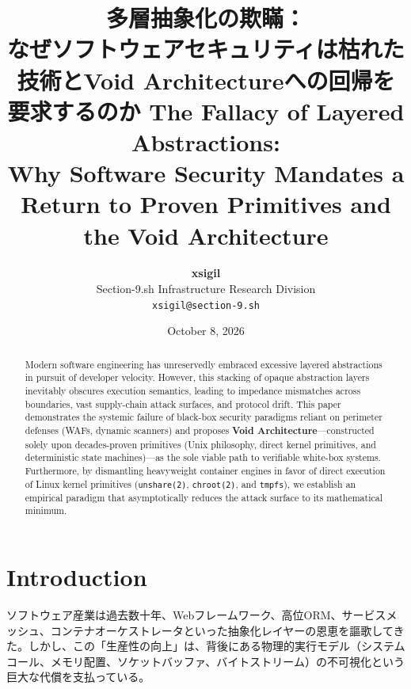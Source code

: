 \documentclass[10pt,a4paper,twocolumn]{article}
\title{\textbf{\Large 
\ifja
多層抽象化の欺瞞：\\なぜソフトウェアセキュリティは枯れた技術とVoid Architecture\texttrademark への回帰を要求するのか
\else
The Fallacy of Layered Abstractions:\\Why Software Security Mandates a Return to Proven Primitives and the Void Architecture\texttrademark
\fi
}}
\author{
    \textbf{xsigil} \\
    Section-9.sh Infrastructure Research Division \\
    \texttt{xsigil@section-9.sh}
}
\date{October 8, 2026}
\newif\ifja
\begin{document}
\maketitle

\begin{abstract}
\ifja
現代のソフトウェア工学は、開発スループットの向上と引き換えに、過度な多層抽象化（Layered Abstraction）を無批判に受け入れてきた。しかし、抽象化レイヤーの積層はシステム内部の実行セマンティクスを不可視化し、境界間のインピーダンスミスマッチ、巨大なサプライチェーン攻撃面、プロトコル解釈の乖離を構造的にもたらす。本稿では、境界防御（WAF、動的解析スキャナ）に依存するブラックボックスセキュリティの破綻を数学的に証明し、システムを検証可能な「ホワイトボックス」へと回帰させる唯一の解として、数十年研ぎ澄まされた枯れた技術（Unix哲学、カーネルプリミティブ、決定論的ステートマシン）のみで構築する\textbf{Void Architecture\texttrademark}を提唱する。さらに、重厚なコンテナランタイムを排除し、Linuxカーネルの \texttt{unshare(2)}、\texttt{chroot(2)}、\texttt{tmpfs} を直接行使することで、攻撃面を数学的極小値へと漸近させる実証的パラダイムを示す。
\else
Modern software engineering has unreservedly embraced excessive layered abstractions in pursuit of developer velocity. However, this stacking of opaque abstraction layers inevitably obscures execution semantics, leading to impedance mismatches across boundaries, vast supply-chain attack surfaces, and protocol drift. This paper demonstrates the systemic failure of black-box security paradigms reliant on perimeter defenses (WAFs, dynamic scanners) and proposes \textbf{Void Architecture\texttrademark}—constructed solely upon decades-proven primitives (Unix philosophy, direct kernel primitives, and deterministic state machines)—as the sole viable path to verifiable white-box systems. Furthermore, by dismantling heavyweight container engines in favor of direct execution of Linux kernel primitives (\texttt{unshare(2)}, \texttt{chroot(2)}, and \texttt{tmpfs}), we establish an empirical paradigm that asymptotically reduces the attack surface to its mathematical minimum.
\fi
\end{abstract}

\section{
\ifja はじめに \else Introduction \fi
}
\ifja
ソフトウェア産業は過去数十年、Webフレームワーク、高位ORM、サービスメッシュ、コンテナオーケストレータといった抽象化レイヤーの恩恵を謳歌してきた。しかし、この「生産性の向上」は、背後にある物理的実行モデル（システムコール、メモリ配置、ソケットバッファ、バイトストリーム）の不可視化という巨大な代償を支払っている。
\end{document}
